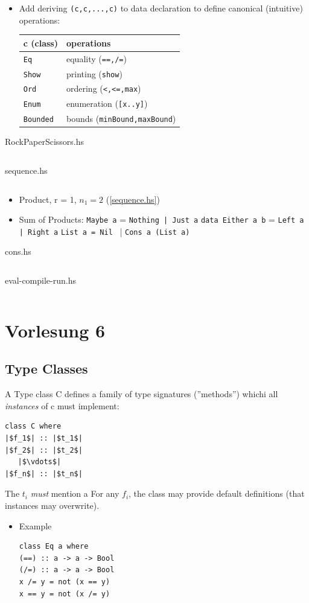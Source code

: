 \documentclass{article}
\newcommand{\Haskell}[1]{\texttt{#1}}
\begin{document}
\begin{itemize}
\item Add deriving \Haskell{(c,c,...,c)} to data declaration to define canonical (intuitive) operations:\\
\begin{tabular}{l|l}
c (class)&operations\\ \hline
\Haskell{Eq}&equality (\Haskell{==,/=})\\
\Haskell{Show}&printing (\Haskell{show})\\
\Haskell{Ord}&ordering  (\Haskell{<,<=,max})\\
\Haskell{Enum}&enumeration (\Haskell{[x..y]})\\
\Haskell{Bounded}& bounds (\Haskell{minBound,maxBound})
\end{tabular}
\end{itemize}
\begin{listing}[h!]
\caption{RockPaperScissors.hs}
\inputminted{Haskell}{RockPaperScissor.hs}
\end{listing}
\begin{listing}[h!]\label{sequence.hs}
\caption{sequence.hs}
\inputminted{Haskell}{sequence.hs}
\end{listing}
\begin{itemize}
\item Product, r = 1, $n_1 = 2$ (\ref{sequence.hs})
\item Sum of Products:
\subitem \Haskell{Maybe a} = \Haskell{Nothing | Just a}
\subitem \Haskell{data Either a b} = \Haskell{Left a | Right a}
\subitem \Haskell{List a = Nil} 
\subitem \phantom{List a}\ | \Haskell{Cons a (List a)}
\end{itemize}
\begin{listing}[h!]
\caption{cons.hs}
\inputminted{Haskell}{cons.hs}
\end{listing}
\begin{listing}[h!]
\caption{eval-compile-run.hs}
\inputminted{Haskell}{eval-compile-run.hs}
\end{listing}
\clearpage
\section{Vorlesung 6}
\subsection{Type Classes}
A Type class C defines a family of type signatures (''methods'') whichi all \emph{instances} of c must implement:\\
\begin{verbatim}
class C where
|$f_1$| :: |$t_1$|
|$f_2$| :: |$t_2$|
   |$\vdots$|
|$f_n$| :: |$t_n$|
\end{verbatim}
The  $t_i$ \emph{must} mention a For any $f_i$, the class may provide default definitions (that instances may overwrite).\\
\begin{itemize}
\item Example
\begin{verbatim}
class Eq a where 
(==) :: a -> a -> Bool
(/=) :: a -> a -> Bool
x /= y = not (x == y)
x == y = not (x /= y)
\end{verbatim}
\end{itemize}
\end{document}
